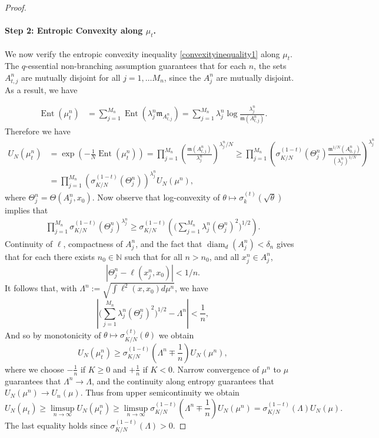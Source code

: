 \documentclass{article}
\newcommand{\N}{\mathbb{N}}
\newcommand{\m}{\mathfrak{m}}
\DeclareMathOperator{\diam}{diam}
\DeclareMathOperator{\Ent}{Ent}
\theoremstyle{definition}
\begin{document}
{\begin{proof}
\paragraph{Step 2: Entropic Convexity along $\mu_t$.}


We now verify the entropic convexity inequality \eqref{convexityinequality1} along $\mu_t$. The $q$-essential non-branching assumption guarantees that for each $n$, the sets $A_{t,j}^n$ are mutually disjoint for all $j=1,\dots M_n$, since the $A_j^n$ are mutually disjoint. As a result, we have 

\begin{align*}
\Ent(\mu_t^n) &= \sum_{j=1}^{M_n}\Ent(\lambda_j^n\m_{A_{t,j}^n}) = \sum_{j=1}^{M_n} \lambda_j^n\log\frac{\lambda_j^n}{\m(A_{t,j}^n)}.
\end{align*}
Therefore we have 
\begin{align*}
U_N(\mu_t^n) &=\exp\left(-\frac1N\Ent(\mu_t^n)\right) =\prod_{j=1}^{M_n} \left(\frac{\m(A_{t,j}^n)}{\lambda_j^n}\right)^{\lambda_j^n/N} \geq \prod_{j=1}^{M_n}\left(\sigma_{K/N}^{(1-t)}(\Theta_j^n)\frac{\m^{1/N}(A_{0,j}^n)}{(\lambda_j^n)^{1/N}}\right)^{\lambda_j^n } \\
&= \prod_{j=1}^{M_n}\left(\sigma_{K/N}^{(1-t)}(\Theta_j^n)\right)^{\lambda_j^n} U_N(\mu^n),
\end{align*}
where $\Theta_j^n=\Theta(A_j^n,x_0)$. Now observe that log-convexity of $\theta\mapsto \sigma_{k}^{(t)}(\sqrt \theta)$ implies that 
\begin{align}\label{distortionestimate1}
\prod_{j=1}^{M_n} \sigma_{K/N}^{(1-t)}(\Theta_j^n)^{\lambda_j^n}\geq \sigma_{K/N}^{(1-t)}\left(\Big(\sum_{j=1}^{M_n} \lambda_j^n (\Theta_j^n)^2\Big)^{1/2}\right).
\end{align}
Continuity of $\ell$, compactness of $A_j^n$, and the fact that $\diam_d(A_j^n)<\delta_n$ gives that for each there exists $n_0\in\N$ such that for all $n>n_0$, and all $x_j^n\in A_j^n$, 
\[|\Theta_j^n-\ell(x_j^n,x_0)|<1/n.\]
It follows that, with $\Lambda^n:= \sqrt{\int \ell^2(x,x_0)d\mu^n}$, we have 
\[\left| \Big(\sum_{j=1}^{M_n} \lambda_j^n (\Theta_j^n)^2\Big)^{1/2}-\Lambda^n\right|<\frac 1n,\]
And so by monotonicity of $\theta\mapsto \sigma_{K/N}^{(t)}(\theta)$ we obtain 
\[U_N(\mu_t^n) \geq \sigma_{K/N}^{(1-t)}\left(\Lambda^n\mp \frac 1n\right)U_N(\mu^n), \]
where we choose $-\frac 1n$ if $K\geq 0$ and $+\frac 1n$ if $K<0$. Narrow convergence of $\mu^n$ to $\mu$ guarantees that $\Lambda^n\to \Lambda$, and the continuity along entropy guarantees that $U_N(\mu^n)\to U_n(\mu)$. Thus from upper semicontinuity we obtain
\[U_N(\mu_t)\geq \limsup_{n\to\infty} U_N(\mu_t^n) \geq \limsup_{n\to\infty}\sigma_{K/N}^{(1-t)}\left(\Lambda^n\mp \frac1n\right)U_N(\mu^n)= \sigma_{K/N}^{(1-t)}(\Lambda)U_N(\mu).\]
The last equality holds since $\sigma_{K/N}^{(1-t)}(\Lambda)>0$. 


\end{proof}}
\end{document}

